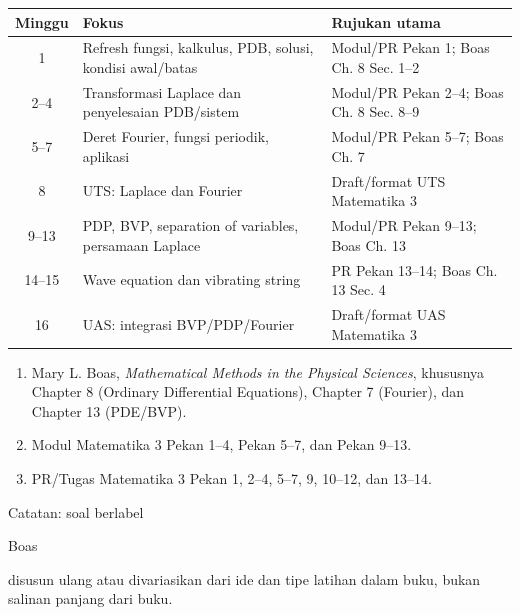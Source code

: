 \documentclass[10pt,a4paper]{article}
\newcommand{\src}[1]{\colorbox{sourcebg}{\scriptsize\strut #1}}
\begin{document}
\begin{infobox}[title={Peta materi dan sumber utama},colbacktitle=iteraBlue2,coltitle=white,fonttitle=\bfseries]
\small
\begin{tabularx}{\textwidth}{@{}c X X@{}}
\toprule
\textbf{Minggu} & \textbf{Fokus} & \textbf{Rujukan utama}\\
\midrule
1 & Refresh fungsi, kalkulus, PDB, solusi, kondisi awal/batas & Modul/PR Pekan 1; Boas Ch. 8 Sec. 1--2\\
2--4 & Transformasi Laplace dan penyelesaian PDB/sistem & Modul/PR Pekan 2--4; Boas Ch. 8 Sec. 8--9\\
5--7 & Deret Fourier, fungsi periodik, aplikasi & Modul/PR Pekan 5--7; Boas Ch. 7\\
8 & UTS: Laplace dan Fourier & Draft/format UTS Matematika 3\\
9--13 & PDP, BVP, separation of variables, persamaan Laplace & Modul/PR Pekan 9--13; Boas Ch. 13\\
14--15 & Wave equation dan vibrating string & PR Pekan 13--14; Boas Ch. 13 Sec. 4\\
16 & UAS: integrasi BVP/PDP/Fourier & Draft/format UAS Matematika 3\\
\bottomrule
\end{tabularx}
\end{infobox}

\begin{infobox}[title={Sumber utama},colbacktitle=iteraBlue2,coltitle=white,fonttitle=\bfseries]
\begin{enumerate}
\item Mary L. Boas, \textit{Mathematical Methods in the Physical Sciences}, khususnya Chapter 8 (Ordinary Differential Equations), Chapter 7 (Fourier), dan Chapter 13 (PDE/BVP).
\item Modul Matematika 3 Pekan 1--4, Pekan 5--7, dan Pekan 9--13.
\item PR/Tugas Matematika 3 Pekan 1, 2--4, 5--7, 9, 10--12, dan 13--14.
\end{enumerate}
Catatan: soal berlabel \src{Boas} disusun ulang atau divariasikan dari ide dan tipe latihan dalam buku, bukan salinan panjang dari buku.
\end{infobox}

\newpage
\end{document}
